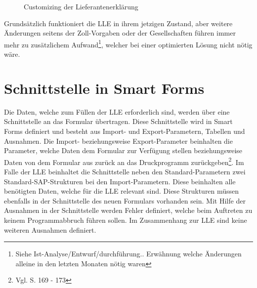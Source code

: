 		
	\begin{figure}[ht]
		\centering
		\caption{Customizing der Lieferantenerklärung }
		\label{fig4}
	\end{figure}

	Grundsätzlich funktioniert die \ac{LLE} in ihrem jetzigen Zustand, aber weitere Änderungen seitens der Zoll-Vorgaben oder der Gesellschaften führen immer mehr zu zusätzlichem Aufwand\footnote{Siehe Ist-Analyse/Entwurf/durchführung.. Erwähnung welche Änderungen alleine in den letzten Monaten nötig waren}, welcher bei einer optimierten Lösung nicht nötig wäre. 

	\FloatBarrier
	
	\section{Schnittstelle in Smart Forms}
	
	Die Daten, welche zum Füllen der \ac{LLE} erforderlich sind, werden über eine Schnittstelle an das Formular übertragen. Diese Schnittstelle wird in Smart Forms definiert und besteht aus Import- und Export-Parametern, Tabellen und Ausnahmen. Die Import- beziehungsweise Export-Parameter beinhalten die Parameter, welche Daten dem Formular zur Verfügung stellen beziehungsweise Daten von dem Formular aus zurück an das Druckprogramm zurückgeben\footnote{Vgl. \cite{Hertleif.2003} S. 169 - 173}. Im Falle der \ac{LLE} beinhaltet die Schnittstelle neben den Standard-Parametern zwei Standard-SAP-Strukturen bei den Import-Parametern. Diese beinhalten alle benötigten Daten, welche für die \ac{LLE} relevant sind. Diese Strukturen müssen ebenfalls in der Schnittstelle des neuen Formulars vorhanden sein. Mit Hilfe der Ausnahmen in der Schnittstelle werden Fehler definiert, welche beim Auftreten zu keinem Programmabbruch führen sollen. Im Zusammenhang zur \ac{LLE} sind keine weiteren Ausnahmen definiert.    
